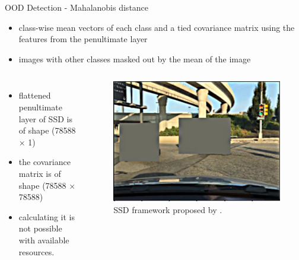 \documentclass[10pt, aspectratio=169]{beamer}
\begin{document}
\begin{frame}[allowframebreaks]{OOD Detection - Mahalanobis distance}
    \begin{itemize}
        \item class-wise mean vectors of each class and a tied covariance matrix using the features from the penultimate layer
        \item images with other classes masked out by the mean of the image
    \end{itemize}
    \begin{columns}
            \begin{itemize}
                \item flattened penultimate layer of SSD is of shape (78588 × 1)
                \item the covariance matrix is of shape (78588 × 78588)
                \item calculating it is not possible with
                available resources.
            \end{itemize}
            \begin{figure}[!ht]
                \centering
                \includegraphics[scale=0.125]{images/rsz_1classspecific-image.png}
                \caption[SSD framework]{SSD framework proposed by \citet[p. 24]{Liu2016SSDSS}.}
            \end{figure}
    \end{columns}
\end{frame}
\end{document}
